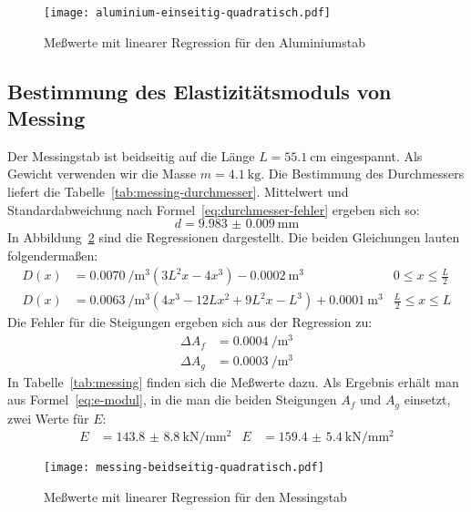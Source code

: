 \begin{figure}
  \centering
  \texttt{[image: aluminium-einseitig-quadratisch.pdf]}
  \caption{Meßwerte mit linearer Regression für den Aluminiumstab}
  \label{fig:aluminium}
\end{figure}


\subsection{Bestimmung des Elastizitätsmoduls von Messing}

Der Messingstab ist beidseitig auf die Länge $L =
\SI{55.1}{\centi\metre}$ eingespannt. Als Gewicht verwenden wir die
Masse $m = \SI{4.1}{\kilogram}$. Die Bestimmung des Durchmessers liefert
die Tabelle~\ref{tab:messing-durchmesser}. Mittelwert und
Standardabweichung nach Formel~\eqref{eq:durchmesser-fehler} ergeben sich so:
%
\begin{equation}
  d = \SI{9.983(9)}{\milli\meter}
\end{equation}
%
In Abbildung~\ref{fig:messing} sind die Regressionen
dargestellt. Die beiden Gleichungen lauten folgendermaßen:
%
\begin{align}
  D(x) &= \SI{0.0070}{\per\cubic\metre} 
  ( 3L^2x-4x^3 ) - \SI{0.0002}{\cubic\metre} 
  & 0 \le x \le \frac{L}{2}\\
  D(x) &= \SI{0.0063}{\per\cubic\metre}
  (4x^3 - 12Lx^2 + 9L^2x - L^3) + \SI{0.0001}{\cubic\metre} 
  & \frac{L}{2} \le x \le L
\end{align}
%
Die Fehler für die Steigungen ergeben sich aus der Regression zu:
%
\begin{align}
  \Delta A_f &= \SI{0.0004}{\per\cubic\metre}\\
  \Delta A_g &= \SI{0.0003}{\per\cubic\metre}
\end{align}
%
In Tabelle~\ref{tab:messing} finden sich die Meßwerte dazu. Als
Ergebnis erhält man aus Formel~\eqref{eq:e-modul}, in die man die beiden
Steigungen $A_f$ und $A_g$ einsetzt, zwei Werte für $E$:
\begin{align}
 E&=\SI{143.8(88)}{\kilo\newton\per\milli\metre\squared} &
 E&=\SI{159.4(54)}{\kilo\newton\per\milli\metre\squared}
\end{align}

\begin{figure}
  \centering
  \texttt{[image: messing-beidseitig-quadratisch.pdf]}
  \caption{Meßwerte mit linearer Regression für den Messingstab}
  \label{fig:messing}
\end{figure}

